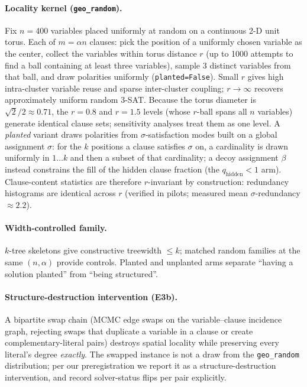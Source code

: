 \documentclass[11pt]{article}
\begin{document}
\paragraph{Locality kernel (\texttt{geo\_random}).}
Fix $n=400$ variables placed uniformly at random on a continuous 2-D unit
torus. Each of $m=\alpha n$ clauses: pick the position of a uniformly chosen
variable as the center, collect the
variables within torus distance $r$ (up to 1000 attempts to find a ball
containing at least three variables), sample 3 distinct variables from that
ball, and draw polarities uniformly
(\texttt{planted=False}). Small $r$ gives high intra-cluster variable reuse
and sparse inter-cluster coupling; $r\to\infty$ recovers approximately uniform
random 3-SAT. Because the torus diameter is ${\sqrt{2}}/{2}\approx0.71$, the
$r{=}0.8$ and $r{=}1.5$ levels (whose $r$-ball spans all $n$ variables)
generate identical clause sets; sensitivity analyses treat them as one level.
A \emph{planted} variant draws polarities from
$\sigma$-satisfaction modes built on a global assignment $\sigma$: for the
$k$ positions a clause satisfies $\sigma$ on, a cardinality is drawn uniformly
in $1\ldots k$ and then a subset of that cardinality; a decoy assignment
$\beta$ instead constrains the fill of the hidden clause fraction (the
$q_{\text{hidden}}<1$ arm). Clause-content statistics are therefore
$r$-invariant by construction: redundancy histograms are identical across $r$
(verified in pilots; measured mean $\sigma$-redundancy ${\approx}2.2$).

\paragraph{Width-controlled family.}
$k$-tree skeletons give constructive treewidth $\le k$; matched random
families at the same $(n,\alpha)$ provide controls. Planted and unplanted arms
separate ``having a solution planted'' from ``being structured''.

\paragraph{Structure-destruction intervention (E3b).}
A bipartite swap chain (MCMC edge swaps on the variable--clause incidence
graph, rejecting swaps that duplicate a variable in a clause or create
complementary-literal pairs) destroys spatial locality while preserving every
literal's degree \emph{exactly}. The swapped instance is not a draw from the
\texttt{geo\_random} distribution; per our preregistration we report it as a
structure-destruction intervention, and record solver-status flips per pair
explicitly.
\end{document}
